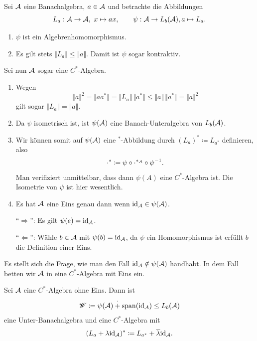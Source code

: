\begin{remark}
    Sei $\mathcal{A}$ eine Banachalgebra, $a \in \mathcal{A}$ und betrachte die Abbildungen
    $$ L_a : \mathcal{A} \to \mathcal{A}, \ x \mapsto ax, \qquad \psi : \mathcal{A} \to L_b(\mathcal{A}), a \mapsto L_a. $$
    \begin{enumerate}
        \item $\psi$ ist ein Algebrenhomomorphismus.
        \item Es gilt stets $\Vert L_a \Vert \leq \Vert a \Vert$. Damit ist $\psi$ sogar kontraktiv.
    \end{enumerate}
    Sei nun $\mathcal{A}$ sogar eine $C^*$-Algebra.
    \begin{enumerate}[resume]
        \item Wegen
        $$ \Vert a \Vert^2 = \Vert a a^* \Vert = \Vert L_a \Vert \, \Vert a^* \Vert \leq \Vert a \Vert \, \Vert a^* \Vert = \Vert a \Vert^2 $$
        gilt sogar $\Vert L_a \Vert = \Vert a \Vert$.
        \item Da $\psi$ isometrisch ist, ist $\psi(\mathcal{A})$ eine Banach-Unteralgebra von $L_b(\mathcal{A})$.
        \item Wir können somit auf $\psi(\mathcal{A})$ eine ${}^*$-Abbildung durch $(L_a)^* \coloneqq L_{a^*}$ definieren, also
        $$ \cdot^* \coloneqq \psi \circ \cdot^{*_{\mathcal{A}}} \circ \psi^{-1}. $$
        Man verifiziert unmittelbar, dass dann $\psi(A)$ eine $C^*$-Algebra ist. Die Isometrie von $\psi$ ist hier wesentlich.
        \item Es hat $\mathcal{A}$ eine Eins genau dann wenn $\mathrm{id}_{\mathcal{A}} \in \psi(\mathcal{A})$.
        
        ``$\Longrightarrow$'': Es gilt $\psi(e) = \mathrm{id}_{\mathcal{A}}$.

        ``$\Longleftarrow$'': Wähle $b \in \mathcal{A}$ mit $\psi(b) = \mathrm{id}_{\mathcal{A}}$, da $\psi$ ein Homomorphismus ist erfüllt $b$ die Definition einer Eins.
    \end{enumerate}
\end{remark}

Es stellt sich die Frage, wie man den Fall $\mathrm{id}_{\mathcal{A}} \notin \psi(\mathcal{A})$ handhabt. In dem Fall betten wir $\mathcal{A}$ in eine $C^*$-Algebra mit Eins ein.

\begin{proposition}
    Sei $\mathcal{A}$ eine $C^*$-Algebra ohne Eins. Dann ist
    $$ \mathscr{W} \coloneqq \psi(\mathcal{A}) \overset{\cdot}{+} \mathrm{span}(\mathrm{id}_{\mathcal{A}}) \leq L_b(\mathcal{A}) $$
    eine Unter-Banachalgebra und eine $C^*$-Algebra mit
    $$ (L_a + \lambda \mathrm{id}_{\mathcal{A}})^* \coloneqq L_{a^*} + \overline{\lambda} \mathrm{id}_{\mathcal{A}}. $$
\end{proposition}


